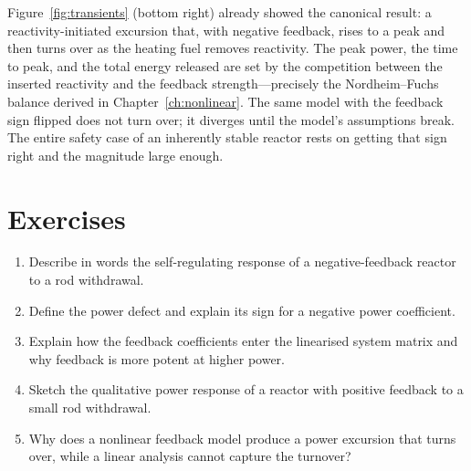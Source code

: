 Figure~\ref{fig:transients} (bottom right) already showed the canonical result:
a reactivity-initiated excursion that, with negative feedback, rises to a peak and
then turns over as the heating fuel removes reactivity. The peak power, the time
to peak, and the total energy released are set by the competition between the
inserted reactivity and the feedback strength---precisely the Nordheim--Fuchs
balance derived in Chapter~\ref{ch:nonlinear}. The same model with the feedback
sign flipped does not turn over; it diverges until the model's assumptions break.
The entire safety case of an inherently stable reactor rests on getting that sign
right and the magnitude large enough.



\section*{Exercises}
\begin{enumerate}[leftmargin=*,itemsep=2pt]
\item Describe in words the self-regulating response of a negative-feedback reactor to a rod withdrawal.
\item Define the power defect and explain its sign for a negative power coefficient.
\item Explain how the feedback coefficients enter the linearised system matrix and why feedback is more potent at higher power.
\item Sketch the qualitative power response of a reactor with positive feedback to a small rod withdrawal.
\item Why does a nonlinear feedback model produce a power excursion that turns over, while a linear analysis cannot capture the turnover?
\end{enumerate}
